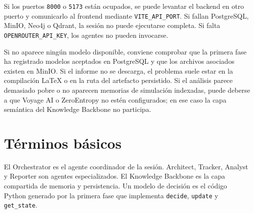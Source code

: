 Si los puertos \texttt{8000} o \texttt{5173} están ocupados, se puede levantar
el backend en otro puerto y comunicarlo al frontend mediante
\texttt{VITE\_API\_PORT}. Si fallan PostgreSQL, MinIO, Neo4j o Qdrant, la
sesión no puede ejecutarse completa. Si falta \texttt{OPENROUTER\_API\_KEY},
los agentes no pueden invocarse.

Si no aparece ningún modelo disponible, conviene comprobar que la primera fase
ha registrado modelos aceptados en PostgreSQL y que los archivos asociados
existen en MinIO. Si el informe no se descarga, el problema suele estar en la
compilación LaTeX o en la ruta del artefacto persistido. Si el análisis parece
demasiado pobre o no aparecen memorias de simulación indexadas, puede deberse a
que Voyage AI o ZeroEntropy no estén configurados; en ese caso la capa semántica
del Knowledge Backbone no participa.

\section{Términos básicos}

El Orchestrator es el agente coordinador de la sesión. Architect, Tracker,
Analyst y Reporter son agentes especializados. El Knowledge Backbone es la
capa compartida de memoria y persistencia. Un modelo de decisión es el
código Python generado por la primera fase que implementa \texttt{decide},
\texttt{update} y \texttt{get\_state}.
